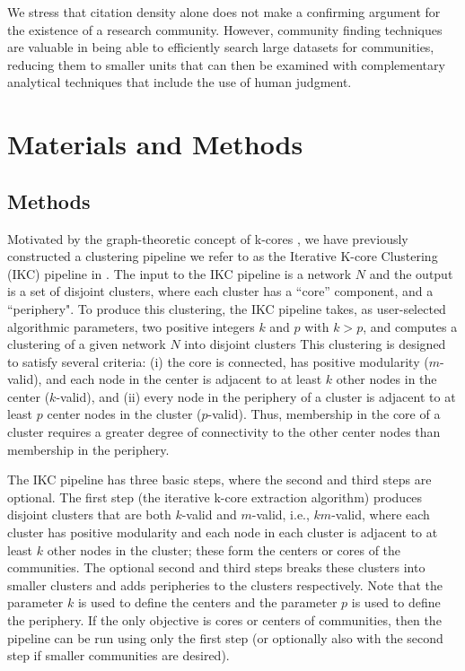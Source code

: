 \documentclass[12pt, oneside]{article}   	%
\begin{document}
   We stress that citation density alone does not make a confirming argument for the existence of a research community. However, community finding techniques are valuable in being able to efficiently search large datasets for communities, reducing them to smaller units that can then be examined with complementary analytical techniques that include the use of human judgment. 

\section{Materials and Methods}
	
\subsection{Methods} Motivated by the graph-theoretic concept of k-cores \citep{Giatsidis2011,malliaros2019}, we have previously constructed a clustering pipeline we refer to as  the Iterative K-core Clustering (IKC) pipeline in \cite{Wedell2022}. The input to the IKC pipeline is a network $N$ and the output is a set of disjoint clusters, where each cluster has a ``core'' component, and a ``periphery".  To produce this clustering,
the IKC pipeline takes, as user-selected algorithmic parameters, two positive integers $k$ and $p$ with $k > p$, and computes a clustering of a given network $N$ into disjoint clusters 
This clustering is designed to satisfy several criteria: (i) the core is connected,  has positive modularity ($m$-valid), and each node in the center  is adjacent to at least $k$ other nodes in the center ($k$-valid), and (ii) every node in the periphery of a cluster is adjacent to at least $p$ center nodes in the cluster ($p$-valid). Thus, membership in the core of a cluster requires a greater degree of connectivity to the other center nodes than membership in the periphery. 

The IKC pipeline has three basic steps, where the second and third steps are optional.  The first step (the iterative k-core extraction algorithm) produces disjoint clusters that are both $k$-valid and $m$-valid, i.e.,  $km$-valid, where each cluster has positive modularity and each node in each cluster is adjacent to at least $k$ other nodes in the cluster; these form the centers or cores of the communities. The optional second and third steps breaks these clusters into smaller clusters and adds peripheries to the clusters respectively.  Note that the parameter $k$ is used to define the centers and the parameter $p$ is used to define the periphery. If the only objective is cores or centers of communities, then the pipeline can be run using only the first step (or optionally also with the second step if smaller communities are desired).
\end{document}
